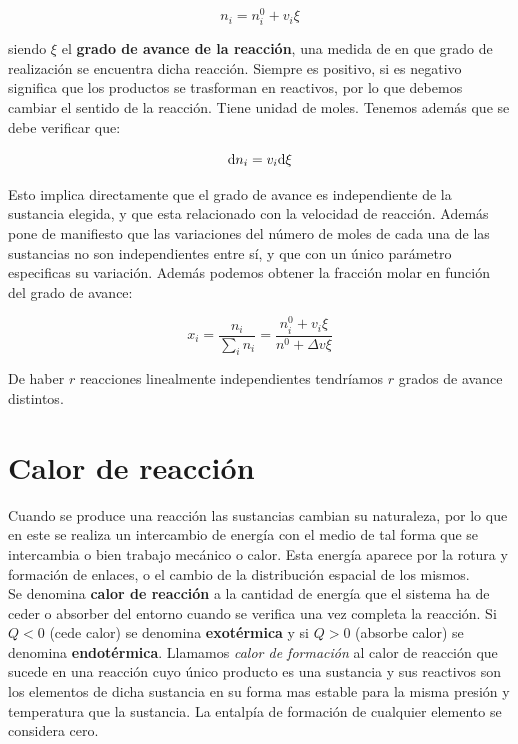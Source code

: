 \documentclass[12pt]{book}
\begin{document}
\begin{equation}
n_i = n_i^0 + v_i \xi 
\end{equation}

siendo $\xi$ el \textbf{grado de avance de la reacción}, una medida de en que grado de realización se encuentra dicha reacción. Siempre es positivo, si es negativo significa que los productos se trasforman en reactivos, por lo que debemos cambiar el sentido de la reacción. Tiene unidad de moles. Tenemos además que se debe verificar que:

\begin{equation}
\mathrm{d} n_i = v_i \mathrm{d} \xi
\end{equation}


Esto implica directamente que el grado de avance es independiente de la sustancia elegida, y que esta relacionado con la velocidad de reacción. Además pone de manifiesto que las variaciones del número de moles de cada una de las sustancias no son independientes entre sí, y que con un único parámetro especificas su variación. Además podemos obtener la fracción molar en función del grado de avance:

\begin{equation}
x_i = \dfrac{n_i}{\sum_i n_i} = \dfrac{n_i^0 + v_i \xi }{n^0 + \Delta v \xi}
\end{equation}

De haber $r$ reacciones linealmente independientes tendríamos $r$ grados de avance distintos.

\section{Calor de reacción}

Cuando se produce una reacción las sustancias cambian su naturaleza, por lo que en este se realiza un intercambio de energía con el medio de tal forma que se intercambia o bien trabajo mecánico o calor. Esta energía aparece por la rotura y formación de enlaces, o el cambio de la distribución espacial de los mismos. \\

Se denomina \textbf{calor de reacción} a la cantidad de energía que el sistema ha de ceder o absorber del entorno cuando se verifica una vez completa la reacción. Si $Q<0$ (cede calor) se denomina \textbf{exotérmica} y si $Q>0$ (absorbe calor) se denomina \textbf{endotérmica}. Llamamos \textit{calor de formación} al calor de reacción que sucede en una reacción cuyo único producto es una sustancia y sus reactivos son los elementos de dicha sustancia en su forma mas estable para la misma presión y temperatura que la sustancia. La entalpía de formación de cualquier elemento se considera cero.
 \\
\end{document}
